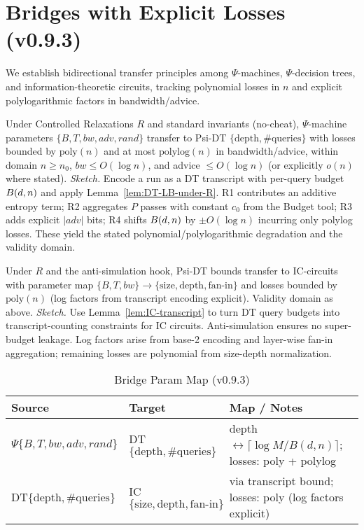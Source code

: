 \section{Bridges with Explicit Losses (v0.9.3)}

We establish bidirectional transfer principles among $\Psi$-machines, $\Psi$-decision trees, and information-theoretic circuits, tracking polynomial losses in $n$ and explicit polylogarithmic factors in bandwidth/advice.

\begin{theorem}\label{thm:bridge-machine-tree}
Under Controlled Relaxations $R$ and standard invariants (no-cheat), $\Psi$-machine parameters $\{B,T,bw,adv,rand\}$ transfer to Psi-DT $\{\mathrm{depth},\#\mathrm{queries}\}$ with losses bounded by $\mathrm{poly}(n)$ and at most $\mathrm{polylog}(n)$ in bandwidth/advice, within domain $n\ge n_0$, $bw\le O(\log n)$, and advice $\le O(\log n)$ (or explicitly $o(n)$ where stated).
\emph{Sketch.} Encode a run as a DT transcript with per-query budget $\B(d,n)$ and apply Lemma~\ref{lem:DT-LB-under-R}. R1 contributes an additive entropy term; R2 aggregates $P$ passes with constant $c_0$ from the Budget tool; R3 adds explicit $|adv|$ bits; R4 shifts $\B(d,n)$ by $\pm O(\log n)$ incurring only polylog losses. These yield the stated polynomial/polylogarithmic degradation and the validity domain.
\end{theorem}

\begin{theorem}\label{thm:bridge-tree-circuit}
Under $R$ and the anti-simulation hook, Psi-DT bounds transfer to IC-circuits with parameter map $\{B,T,bw\}\to\{\text{size},\text{depth},\text{fan-in}\}$ and losses bounded by $\mathrm{poly}(n)$ (log factors from transcript encoding explicit). Validity domain as above.
\emph{Sketch.} Use Lemma~\ref{lem:IC-transcript} to turn DT query budgets into transcript-counting constraints for IC circuits. Anti-simulation ensures no super-budget leakage. Log factors arise from base-2 encoding and layer-wise fan-in aggregation; remaining losses are polynomial from size-depth normalization.
\end{theorem}

\begin{table}[t]
\centering
\caption{Bridge Param Map (v0.9.3)}
\begin{tabular}{lll}
\toprule
Source & Target & Map / Notes \\
\midrule
$\Psi\{B,T,bw,adv,rand\}$ & DT$\{\mathrm{depth},\#\mathrm{queries}\}$ & depth $\leftrightarrow \lceil \log M / B(d,n)\rceil$; losses: poly + polylog \\
DT$\{\mathrm{depth},\#\mathrm{queries}\}$ & IC$\{\text{size},\text{depth},\text{fan-in}\}$ & via transcript bound; losses: poly (log factors explicit) \\
\bottomrule
\end{tabular}
\end{table}